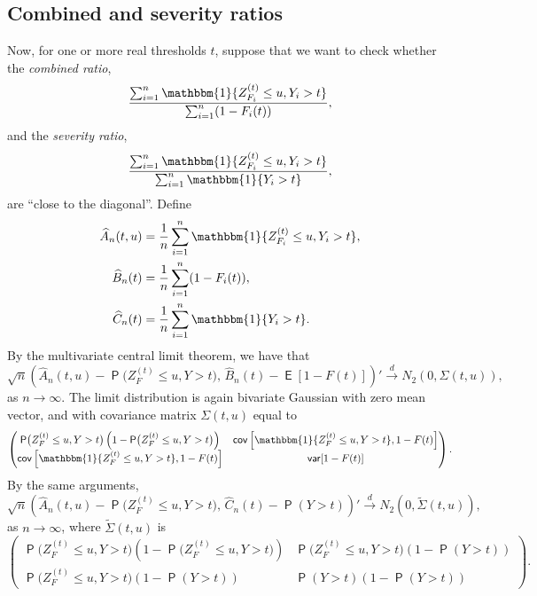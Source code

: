 \documentclass[12pt]{article}
\newcommand{\one}{\mathbbm{1}}
\newcommand{\Q}{\operatorname{\mathsf{P}}}
\newcommand{\expec}{\operatorname{\mathsf{E}}} %
\newcommand{\cov}{\operatorname{\mathsf{cov}}}
\newcommand{\var}{\operatorname{\mathsf{var}}}
\newcommand{\1}{\mathbf{1}} %
\newcommand{\Zit}{Z_{F_{i}}^{(t)}}
\newcommand{\ZFt}{Z_{F}^{(t)}} %
\theoremstyle{definition}
\begin{document}
\subsection{Combined and severity ratios}

Now, for one or more real thresholds $t$, suppose that we want to check whether the \emph{combined ratio},
\begin{equation}
	\label{eq:combined}
	\frac{\sum_{i =1}^n \one\{\Zit \leq u, Y_i > t\}}{ \sum_{i = 1}^{n} (1 - F_{i}(t))},
\end{equation}
and the \emph{severity ratio},
\begin{equation}
	\label{eq:severity}
	\frac{\sum_{i =1}^n \one\{\Zit \leq u, Y_i > t\}}{\sum_{i = 1}^{n} \one\{Y_i > t\}},
\end{equation}
are ``close to the diagonal''. Define
\begin{align*}
    \widehat{A}_n(t,u) &= \frac{1}{n} \sum_{i=1}^n \one\{ \Zit \le u, Y_i > t \}, \\
    \widehat{B}_n(t) &= \frac{1}{n} \sum_{i=1}^n (1-F_i(t)),\\
    \widehat{C}_n(t) &= \frac{1}{n} \sum_{i=1}^n \one\{ Y_i > t \}.
\end{align*}
By the multivariate central limit theorem, we have that
\[
    \sqrt{n} \left( 
        \widehat{A}_n(t,u) - \Q\bigl(\ZFt \le u, Y > t \bigr), \, 
        \widehat{B}_n(t) - \expec[1-F(t)] 
    \right)'
    \xrightarrow{d}
    N_2(0, \Sigma(t,u)),
\]
as $n \to \infty$. The limit distribution is again bivariate Gaussian with zero mean vector, and with covariance matrix $\Sigma(t,u)$ equal to
\[
     \begin{pmatrix}
        \Q\bigl(\ZFt \le u, Y > t \bigr) \left( 1 - \Q\bigl(\ZFt \le u, Y > t \bigr)\right) &
        \cov \left[ \one\{\ZFt \le u, Y > t \}, 1 - F(t) \right] \\
        \cov \left[ \one\{\ZFt \le u, Y > t \}, 1 - F(t) \right] & \var[1-F(t)]
    \end{pmatrix}.
\]
By the same arguments, 
\[
    \sqrt{n} \left( 
        \widehat{A}_n(t,u) - \Q\bigl(\ZFt \le u, Y > t \bigr), \, 
        \widehat{C}_n(t) - \Q(Y > t) 
    \right)'
    \xrightarrow{d}
    N_2\left(0, \tilde{\Sigma}(t,u)\right),
\]
as $n \to \infty$, where $\tilde{\Sigma}(t,u)$ is
\[
    \begin{pmatrix}
        \Q\bigl(\ZFt \le u, Y > t \bigr) \left( 1 - \Q\bigl(\ZFt \le u, Y > t \bigr)\right) &
        \Q\bigl(\ZFt \le u, Y > t \bigr)(1-\Q(Y > t))\\
        \Q\bigl(\ZFt \le u, Y > t \bigr)(1-\Q(Y > t)) & \Q(Y > t)(1-\Q(Y > t))
    \end{pmatrix}.
\]
\end{document}
